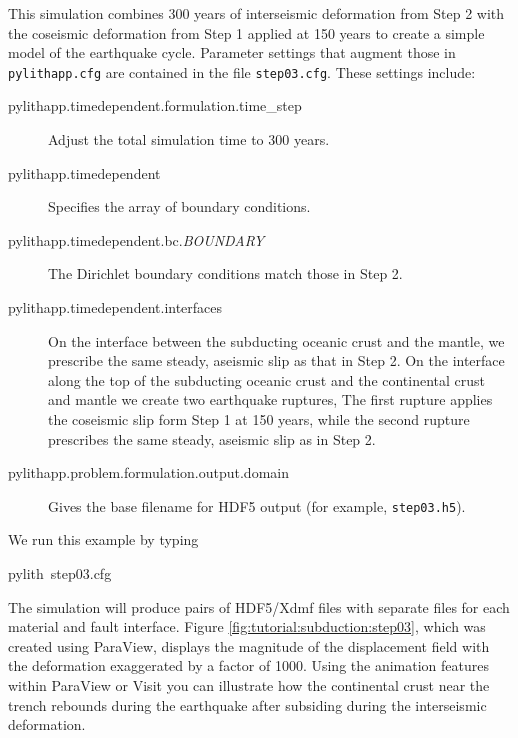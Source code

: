 This simulation combines 300 years of interseismic deformation from
Step 2 with the coseismic deformation from Step 1 applied at 150 years
to create a simple model of the earthquake cycle. Parameter settings
that augment those in \texttt{pylithapp.cfg} are contained in the
file \texttt{step03.cfg}. These settings include:
\begin{description}
\item [{pylithapp.timedependent.formulation.time\_step}] Adjust the total
simulation time to 300 years.
\item [{pylithapp.timedependent}] Specifies the array of boundary conditions.
\item [{pylithapp.timedependent.bc.\textit{BOUNDARY}}] The Dirichlet boundary
conditions match those in Step 2.
\item [{pylithapp.timedependent.interfaces}] On the interface between the
subducting oceanic crust and the mantle, we prescribe the same steady,
aseismic slip as that in Step 2. On the interface along the top of
the subducting oceanic crust and the continental crust and mantle
we create two earthquake ruptures, The first rupture applies the coseismic
slip form Step 1 at 150 years, while the second rupture prescribes
the same steady, aseismic slip as in Step 2.
\item [{pylithapp.problem.formulation.output.domain}] Gives the base filename
for HDF5 output (for example, \texttt{step03.h5}).
\end{description}
We run this example by typing
\begin{lyxcode}
pylith~step03.cfg
\end{lyxcode}
The simulation will produce pairs of HDF5/Xdmf files with separate
files for each material and fault interface. Figure \ref{fig:tutorial:subduction:step03},
which was created using ParaView, displays the magnitude of the displacement
field with the deformation exaggerated by a factor of 1000. Using
the animation features within ParaView or Visit you can illustrate
how the continental crust near the trench rebounds during the earthquake
after subsiding during the interseismic deformation. 

